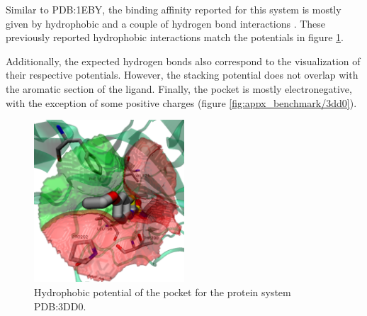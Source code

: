       Similar to PDB:1EBY, the binding affinity reported for this system is mostly given by hydrophobic and a couple of hydrogen bond interactions \cite{benchmark_strong_2021}. These previously reported hydrophobic interactions match the potentials in figure \ref{fig:benchmark/3dd0}.

      Additionally, the expected hydrogen bonds also correspond to the visualization of their respective potentials. However, the stacking potential does not overlap with the aromatic section of the ligand. Finally, the pocket is mostly electronegative, with the exception of some positive charges (figure \ref{fig:appx_benchmark/3dd0}).

      \begin{figure}[H]
        \centering
        \includegraphics[width=0.5\textwidth]{figures/results/benchmark_prot/3dd0.png}
        \caption{\label{fig:benchmark/3dd0} Hydrophobic potential of the pocket for the protein system PDB:3DD0.}
      \end{figure}
    \pagebreak

